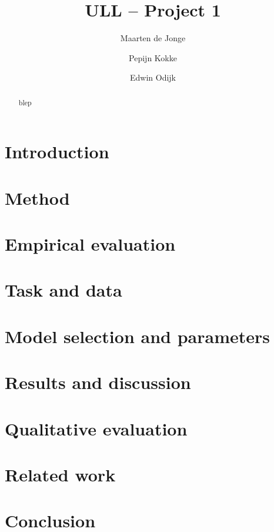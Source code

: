 \documentclass[11pt]{article}
\title{ULL -- Project 1}
\author{Maarten de Jonge \and Pepijn Kokke \and Edwin Odijk}
\date{}
\begin{document}
\maketitle

\begin{abstract}
blep
\end{abstract}

\section{Introduction}

\section{Method}

\section{Empirical evaluation}

\section{Task and data}

\section{Model selection and parameters}

\section{Results and discussion}

\section{Qualitative evaluation}

\section{Related work}

\section{Conclusion}
\end{document}
